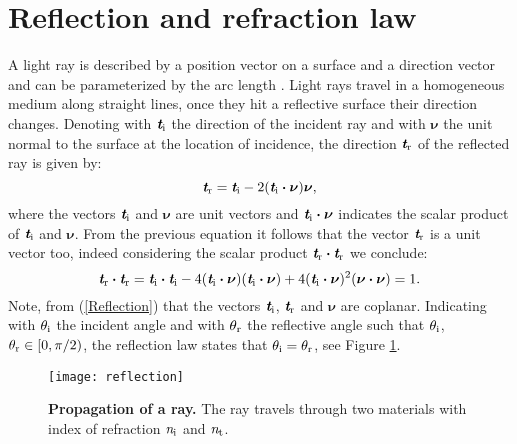 \section{Reflection and refraction law}\label{sec:reflection}
A light ray is described by a position vector  on a surface and a direction vector  and can be parameterized by the arc length .
Light rays travel in a homogeneous medium along straight lines, once they hit a reflective surface their direction changes.
 Denoting with $\textit{\textbf{t}}_\textrm{i}$ the direction of the incident ray and with $\boldsymbol{\nu}$ the unit normal to the surface at the location of incidence, the direction $\textit{\textbf{t}}_\textrm{r}$ of the reflected ray is given by:
 \begin{equation}\label{Reflection}
  \textit{\textbf{t}}_\textrm{r} = \textit{\textbf{t}}_\textrm{i}-2 (\textit{\textbf{t}}_\textrm{i}\boldsymbol{\cdot}\boldsymbol{\nu})\boldsymbol{\nu},
\end{equation}
where the vectors $\textit{\textbf{t}}_\textrm{i}$ and $\boldsymbol{\nu}$ are unit vectors and $\textit{\textbf{t}}_\textrm{i}\boldsymbol{\cdot}\boldsymbol{\nu}$ indicates the scalar product of
$\textit{\textbf{t}}_\textrm{i}$ and $\boldsymbol{\nu}$. 
From the previous equation it follows that the vector  $\textit{\textbf{t}}_\textrm{r}$ is a unit vector too, indeed considering the scalar product $\textit{\textbf{t}}_\textrm{r}\boldsymbol{\cdot}\textit{\textbf{t}}_\textrm{r}$ we conclude:
\begin{equation}\label{unit_vector}
\textit{\textbf{t}}_\textrm{r}\boldsymbol{\cdot}\textit{\textbf{t}}_\textrm{r} = \textit{\textbf{t}}_\textrm{i}\boldsymbol{\cdot}\textit{\textbf{t}}_\textrm{i} 
- 4(\textit{\textbf{t}}_\textrm{i}\boldsymbol{\cdot}\boldsymbol{\nu})(\textit{\textbf{t}}_\textrm{i}\boldsymbol{\cdot}\boldsymbol{\nu})+
4(\textit{\textbf{t}}_\textrm{i}\boldsymbol{\cdot}\boldsymbol{\nu})^2(\boldsymbol{\nu}\boldsymbol{\cdot}\boldsymbol{\nu})=1 .
\end{equation} 
Note, from (\ref{Reflection}) that the vectors $\textit{\textbf{t}}_\textrm{i}$, $\textit{\textbf{t}}_\textrm{r}$ and $\boldsymbol{\nu}$ are coplanar.
Indicating with $\theta_\textrm{i}$ the incident angle and with $\theta_\textrm{r}$ the reflective angle such that $\theta_\textrm{i}$, $\theta_\textrm{r} \in[0, \pi/2)$,
the reflection law states that $\theta_\textrm{i}=\theta_\textrm{r}$, see Figure \ref{fig:Snell}.
\begin{figure}[t]
 \label{fig:Snell}
     \begin{center}
     \texttt{[image: reflection]}
     \end{center}
     \caption{\textbf{Propagation of a ray.} The ray travels through two materials with index of refraction $\textit{n}_\textrm{i}$ and $\textit{n}_\textrm{t}$.}%
\label{fig:Snell}
 \end{figure}
